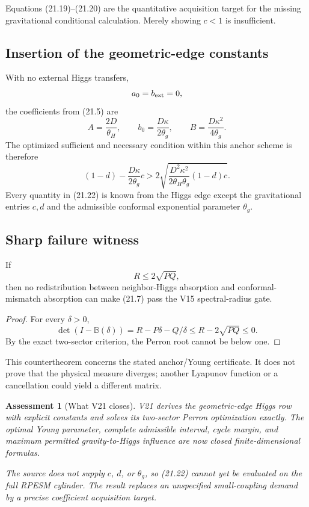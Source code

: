 \documentclass[11pt]{article}
\newtheorem{assessment}[theorem]{Assessment}
\theoremstyle{remark}
\begin{document}
Equations (21.19)--(21.20) are the quantitative acquisition target
for the missing gravitational conditional calculation.  Merely
showing \(c<1\) is insufficient.

\subsection{Insertion of the geometric-edge constants}

With no external Higgs transfers,
\[
 a_0=b_{\rm ext}=0,
\]
the coefficients from (21.5) are
\[
 A=\frac{2D}{\theta_H},\qquad
 b_0=\frac{D\kappa}{2\theta_g},\qquad
 B=\frac{D\kappa^2}{4\theta_g}.                    \tag{21.21}
\]
The optimized sufficient and necessary condition within this
anchor scheme is therefore
\[
\boxed{
 (1-d)-\frac{D\kappa}{2\theta_g}c
 >
 2\sqrt{
 \frac{D^2\kappa^2}{2\theta_H\theta_g}
 (1-d)c}.}                                         \tag{21.22}
\]
Every quantity in (21.22) is known from the Higgs edge except the
gravitational entries \(c,d\) and the admissible conformal
exponential parameter \(\theta_g\).

\subsection{Sharp failure witness}

\begin{countertheorem}
\label{ctr:v17v21-no-delta}
If
\[
 R\leq2\sqrt{PQ},                                  \tag{21.23}
\]
then no redistribution between neighbor-Higgs absorption and
conformal-mismatch absorption can make (21.7) pass the V15
spectral-radius gate.
\end{countertheorem}

\begin{proof}
For every \(\delta>0\),
\[
 \det(I-{\mathbb B}(\delta))
 =R-P\delta-Q/\delta
 \leq R-2\sqrt{PQ}\leq0.
\]
By the exact two-sector criterion, the Perron root cannot be below
one.
\end{proof}

This countertheorem concerns the stated anchor/Young certificate.
It does not prove that the physical measure diverges; another
Lyapunov function or a cancellation could yield a different
matrix.

\begin{assessment}[What V21 closes]
\label{ass:v17v21-status}
V21 derives the geometric-edge Higgs row with explicit constants
and solves its two-sector Perron optimization exactly.  The optimal
Young parameter, complete admissible interval, cycle margin, and
maximum permitted gravity-to-Higgs influence are now closed
finite-dimensional formulas.

The source does not supply \(c\), \(d\), or \(\theta_g\), so
(21.22) cannot yet be evaluated on the full RPESM cylinder.  The
result replaces an unspecified small-coupling demand by a precise
coefficient acquisition target.
\end{assessment}
\end{document}
